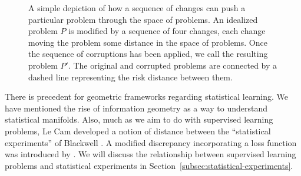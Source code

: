 \documentclass[twoside,11pt]{article}
\newcommand{\dexp}[1][]{d_{\mathrm{R}#1}}
\newcommand{\facundo}[1]                {{\textcolor{red} {#1}}}
\newcommand{\brantley}[1]                {{\textcolor{blue} {#1}}}
\begin{document}
\begin{figure}
    \centering
    \caption{A simple depiction of how a sequence of changes can push a particular problem through the space of problems. An idealized problem $P$ is modified by a sequence of four changes, each change moving the problem some distance in the space of problems. Once the sequence of corruptions has been applied, we call the resulting problem $P'$. The original and corrupted problems are connected by a dashed line representing the risk distance between them.}
    \label{fig:small-changes}
\end{figure}
There is precedent for geometric frameworks regarding statistical learning. We have mentioned the rise of information geometry as a way to understand statistical manifolds. Also, much as we aim to do with supervised learning problems, Le Cam developed a notion of distance \citep{leCam_sufficiency, mariucci2016le} between the ``statistical experiments'' of Blackwell \citep{blackwell_comparison_1951}. A modified discrepancy incorporating a loss function was introduced by \citet[Complement 37]{torgersen_comparison_1991}. We will discuss the relationship between supervised learning problems and statistical experiments in Section~\ref{subsec:statistical-experiments}. %
\end{document}
